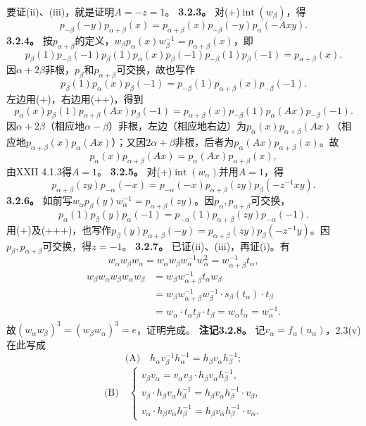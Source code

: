 要证(ii)、(iii)，就是证明$A=-z=1$。
\textbf{3.2.3。} 对(+)$\operatorname{int}(w_\beta)$，得
\[p_{-\beta}(-y)p_{\alpha+\beta}(x)=p_{\alpha+\beta}(x)p_{-\beta}(-y)p_\alpha(-Axy).\tag{++}\]
\textbf{3.2.4。} 按$p_{\alpha+\beta}$的定义，$w_\beta p_\alpha(x)w_\beta^{-1}=p_{\alpha+\beta}(x)$，即
\[p_\beta(1)p_{-\beta}(-1)p_\beta(1)p_\alpha(x)p_\beta(-1)p_{-\beta}(1)p_\beta(-1)=p_{\alpha+\beta}(x).\]
因$\alpha+2\beta$非根，$p_\beta$和$p_{\alpha+\beta}$可交换，故也写作
\[p_\beta(1)p_\alpha(x)p_\beta(-1)=p_{-\beta}(1)p_{\alpha+\beta}(x)p_{-\beta}(-1).\]
左边用(+)，右边用(++)，得到
\[p_\alpha(x)p_\beta(1)p_{\alpha+\beta}(Ax)p_\beta(-1)=p_{\alpha+\beta}(x)p_{-\beta}(1)p_\alpha(Ax)p_{-\beta}(-1).\]
因$\alpha+2\beta$（相应地$\alpha-\beta$）非根，左边（相应地右边）为$p_\alpha(x)p_{\alpha+\beta}(Ax)$（相应地$p_{\alpha+\beta}(x)p_\alpha(Ax)$）；又因$2\alpha+\beta$非根，后者为$p_\alpha(Ax)p_{\alpha+\beta}(x)$。故
\[p_\alpha(x)p_{\alpha+\beta}(Ax)=p_\alpha(Ax)p_{\alpha+\beta}(x),\]
由XXII 4.1.3得$A=1$。
\textbf{3.2.5。} 对(+)$\operatorname{int}(w_\alpha)$并用$A=1$，得
\[p_{\alpha+\beta}(zy)p_{-\alpha}(-x)=p_{-\alpha}(-x)p_{\alpha+\beta}(zy)p_\beta(-z^{-1}xy).\tag{+++}\]
\textbf{3.2.6。} 如前写$w_\alpha p_\beta(y)w_\alpha^{-1}=p_{\alpha+\beta}(zy)$。因$p_\alpha,p_{\alpha+\beta}$可交换，
\[p_\alpha(1)p_\beta(y)p_\alpha(-1)=p_{-\alpha}(1)p_{\alpha+\beta}(zy)p_{-\alpha}(-1).\]
用(+)及(+++)，也写作$p_\beta(y)p_{\alpha+\beta}(-y)=p_{\alpha+\beta}(zy)p_\beta(-z^{-1}y)$。因$p_\beta,p_{\alpha+\beta}$可交换，得$z=-1$。
\textbf{3.2.7。} 已证(ii)、(iii)，再证(i)。有
\[w_\alpha w_\beta w_\alpha=w_\alpha w_\beta w_\alpha^{-1}w_\alpha^2=w_{\alpha+\beta}^{-1}t_\alpha,\]
\[\begin{aligned}w_\beta w_\alpha w_\beta w_\alpha w_\beta&=w_\beta w_{\alpha+\beta}^{-1}t_\alpha w_\beta\\&=w_\beta w_{\alpha+\beta}^{-1}w_\beta^{-1}\cdot s_\beta(t_\alpha)\cdot t_\beta\\&=w_\alpha\cdot t_\alpha t_\beta\cdot t_\beta=w_\alpha t_\alpha=w_\alpha^{-1}.\end{aligned}\]
故$(w_\alpha w_\beta)^3=(w_\beta w_\alpha)^3=e$，证明完成。
\textbf{注记3.2.8。} 记$v_\alpha=f_\alpha(u_\alpha)$，2.3(v)在此写成
\[\text{(A)}\quad h_\alpha v_\beta^{-1}h_\alpha^{-1}=h_\beta v_\alpha h_\beta^{-1};\]
\[\text{(B)}\quad\begin{cases}v_\beta v_\alpha=v_\alpha v_\beta\cdot h_\beta v_\alpha h_\beta^{-1},\\v_\beta\cdot h_\beta v_\alpha h_\beta^{-1}=h_\beta v_\alpha h_\beta^{-1}\cdot v_\beta,\\v_\alpha\cdot h_\beta v_\alpha h_\beta^{-1}=h_\beta v_\alpha h_\beta^{-1}\cdot v_\alpha.\end{cases}\]
